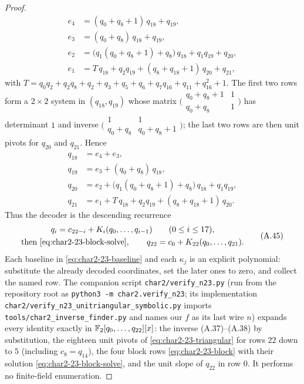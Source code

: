 \begin{proof}
\[
\begin{aligned}
e_4&=(q_0+q_8+1)\,q_{18}+q_{19},\\
e_3&=(q_0+q_8)\,q_{18}+q_{19},\\
e_2&=\bigl(q_1(q_0+q_8+1)+q_8\bigr)\,q_{18}+q_1q_{19}+q_{20},\\
e_1&=T\,q_{18}+q_2q_{19}+(q_8+q_{18}+1)\,q_{20}+q_{21},
\end{aligned}                                                     \tag{A.43}\label{eq:char2-23-block}
\]
with $T=q_0q_2+q_2q_8+q_2+q_3+q_5+q_6+q_7q_{16}+q_{11}+q_{16}^2+1$.  The
first two rows form a $2\times2$ system in $(q_{18},q_{19})$ whose matrix
$\bigl(\begin{smallmatrix}q_0+q_8+1&1\\ q_0+q_8&1\end{smallmatrix}\bigr)$
has determinant $1$ and inverse
$\bigl(\begin{smallmatrix}1&1\\ q_0+q_8&q_0+q_8+1\end{smallmatrix}\bigr)$;
the last two rows are then unit pivots for $q_{20}$ and $q_{21}$.  Hence
\[
\begin{aligned}
q_{18}&=e_4+e_3,\\
q_{19}&=e_3+(q_0+q_8)\,q_{18},\\
q_{20}&=e_2+\bigl(q_1(q_0+q_8+1)+q_8\bigr)\,q_{18}+q_1q_{19},\\
q_{21}&=e_1+T\,q_{18}+q_2q_{19}+(q_8+q_{18}+1)\,q_{20}.
\end{aligned}                                                     \tag{A.44}\label{eq:char2-23-block-solve}
\]
Thus the decoder is the descending recurrence
\[
\begin{gathered}
 q_i=c_{22-i}+K_i(q_0,\ldots,q_{i-1})\qquad(0\le i\le17),\\
 \text{then \eqref{eq:char2-23-block-solve}},\qquad
 q_{22}=c_0+K_{22}(q_0,\ldots,q_{21}).
\end{gathered}                                                     \tag{A.45}\label{eq:char2-23-decoder}
\]
Each baseline in \eqref{eq:char2-23-baseline} and each $\kappa_j$ is an
explicit polynomial: substitute the already decoded coordinates, set the
later ones to zero, and collect the named row.  The companion script \texttt{char2/verify\_n23.py} (run from the
repository root as \texttt{python3 -m char2.verify\_n23}; its implementation
\texttt{char2/verify\_n23\_unitriangular\_symbolic.py} imports
\texttt{tools/char2\_inverse\_finder.py} and names our $f$ as its last wire
$n$) expands every identity exactly in $\mathbb{F}_2[q_0,\ldots,q_{22}][x]$: the
inverse (A.37)--(A.38) by substitution, the eighteen unit pivots of
\eqref{eq:char2-23-triangular} for rows $22$ down to $5$ (including
$c_8=q_{14}$), the four block rows \eqref{eq:char2-23-block} with their
solution \eqref{eq:char2-23-block-solve}, and the unit slope of $q_{22}$ in
row $0$.  It performs no finite-field enumeration.


\end{proof}
